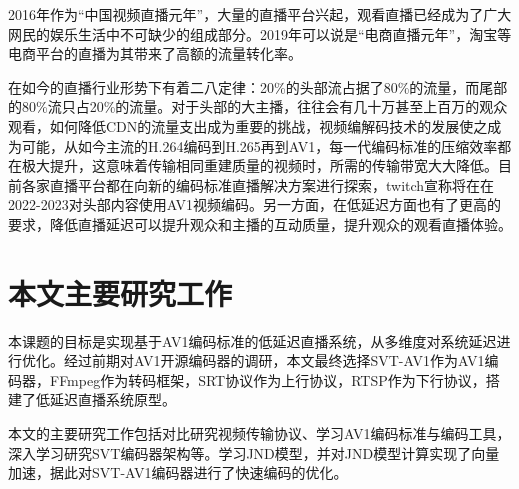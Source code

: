 2016年作为“中国视频直播元年”，大量的直播平台兴起，观看直播已经成为了广大网民的娱乐生活中不可缺少的组成部分。2019年可以说是“电商直播元年”，淘宝等电商平台的直播为其带来了高额的流量转化率。

在如今的直播行业形势下有着二八定律：20\%的头部流占据了80\%的流量，而尾部的80\%流只占20\%的流量。对于头部的大主播，往往会有几十万甚至上百万的观众观看，如何降低CDN的流量支出成为重要的挑战，视频编解码技术的发展使之成为可能，从如今主流的H.264编码到H.265再到AV1，每一代编码标准的压缩效率都在极大提升，这意味着传输相同重建质量的视频时，所需的传输带宽大大降低。目前各家直播平台都在向新的编码标准直播解决方案进行探索，twitch宣称将在在2022-2023对头部内容使用AV1视频编码\cite{shenTwitchTalksVP92019}。另一方面，在低延迟方面也有了更高的要求，降低直播延迟可以提升观众和主播的互动质量，提升观众的观看直播体验。

\section{本文主要研究工作}


本课题的目标是实现基于AV1编码标准的低延迟直播系统，从多维度对系统延迟进行优化。经过前期对AV1开源编码器的调研，本文最终选择SVT-AV1作为AV1编码器，FFmpeg作为转码框架，SRT协议作为上行协议，RTSP作为下行协议，搭建了低延迟直播系统原型。

本文的主要研究工作包括对比研究视频传输协议、学习AV1编码标准与编码工具，深入学习研究SVT编码器架构等。学习JND模型，并对JND模型计算实现了向量加速，据此对SVT-AV1编码器进行了快速编码的优化。

